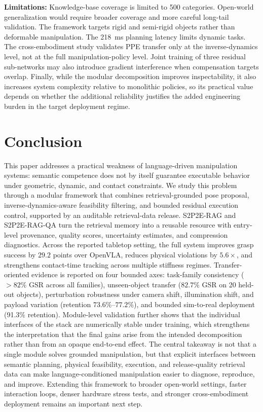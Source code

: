 \documentclass[12pt]{article}
\begin{document}
\textbf{Limitations:} Knowledge-base coverage is limited to 500 categories. Open-world generalization would require broader coverage and more careful long-tail validation. The framework targets rigid and semi-rigid objects rather than deformable manipulation. The 218~ms planning latency limits dynamic tasks. The cross-embodiment study validates PPE transfer only at the inverse-dynamics level, not at the full manipulation-policy level. Joint training of three residual sub-networks may also introduce gradient interference when compensation targets overlap. Finally, while the modular decomposition improves inspectability, it also increases system complexity relative to monolithic policies, so its practical value depends on whether the additional reliability justifies the added engineering burden in the target deployment regime.

\section{Conclusion}

This paper addresses a practical weakness of language-driven manipulation systems: semantic competence does not by itself guarantee executable behavior under geometric, dynamic, and contact constraints. We study this problem through a modular framework that combines retrieval-grounded pose proposal, inverse-dynamics-aware feasibility filtering, and bounded residual execution control, supported by an auditable retrieval-data release. S2P2E-RAG and S2P2E-RAG-QA turn the retrieval memory into a reusable resource with entry-level provenance, quality scores, uncertainty estimates, and compression diagnostics. Across the reported tabletop setting, the full system improves grasp success by $29.2$ points over OpenVLA, reduces physical violations by $5.6\times$, and strengthens contact-time tracking across multiple stiffness regimes. Transfer-oriented evidence is reported on four bounded axes: task-family consistency ($>82\%$ GSR across all families), unseen-object transfer ($82.7\%$ GSR on 20 held-out objects), perturbation robustness under camera shift, illumination shift, and payload variation (retention $73.6\%$--$77.2\%$), and bounded sim-to-real deployment (91.3\% retention). Module-level validation further shows that the individual interfaces of the stack are numerically stable under training, which strengthens the interpretation that the final gains arise from the intended decomposition rather than from an opaque end-to-end effect. The central takeaway is not that a single module solves grounded manipulation, but that explicit interfaces between semantic planning, physical feasibility, execution, and release-quality retrieval data can make language-conditioned manipulation easier to diagnose, reproduce, and improve. Extending this framework to broader open-world settings, faster interaction loops, denser hardware stress tests, and stronger cross-embodiment deployment remains an important next step.
\end{document}
